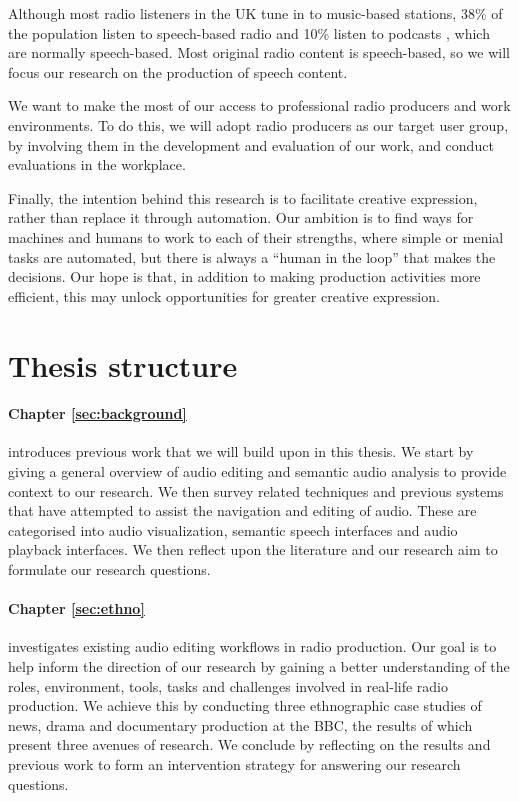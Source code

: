 Although most radio listeners in the UK tune in to music-based stations, 38\% of the population listen to speech-based
radio \citep[pp.  97, 105]{Ofcom2017} and 10\% listen to podcasts \citep{RAJAR2017}, which are normally speech-based.
Most original radio content is speech-based, so we will focus our research on the production of speech content.

We want to make the most of our access to professional radio producers and work environments.  To do this, we will
adopt radio producers as our target user group, by involving them in the development and evaluation of our work, and
conduct evaluations in the workplace.


Finally, the intention behind this research is to facilitate creative expression, rather than replace it through
automation.  Our ambition is to find ways for machines and humans to work to each of their strengths, where simple or
menial tasks are automated, but there is always a ``human in the loop'' that makes the decisions.  Our hope is that, in
addition to making production activities more efficient, this may unlock opportunities for greater creative expression.

\section{Thesis structure}\label{sec:intro-structure}

\paragraph{Chapter \ref{sec:background}} introduces previous work that we will build upon in this thesis. We start by
giving a general overview of audio editing and semantic audio analysis to provide context to our research. We then
survey related techniques and previous systems that have attempted to assist the navigation and editing of audio. These
are categorised into audio visualization, semantic speech interfaces and audio playback interfaces. We then reflect
upon the literature and our research aim to formulate our research questions.

\paragraph{Chapter \ref{sec:ethno}} investigates existing audio editing workflows in radio production. Our goal is to
help inform the direction of our research by gaining a better understanding of the roles, environment, tools, tasks and
challenges involved in real-life radio production.  We achieve this by conducting three ethnographic case studies of
news, drama and documentary production at the BBC, the results of which present three avenues of research.  We conclude
by reflecting on the results and previous work to form an intervention strategy for answering our research questions.

